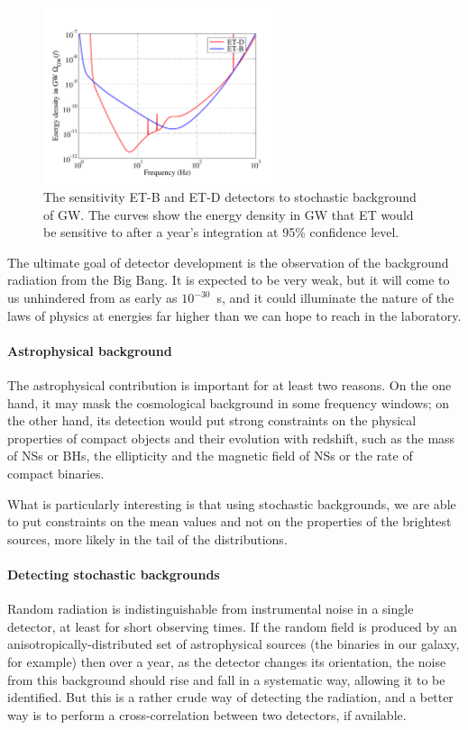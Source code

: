 \begin{figure}
\centering
\includegraphics[width=0.60\textwidth]{./Sec_ET_ScienceCase/GWB.pdf}
\caption{The sensitivity ET-B and ET-D detectors to
stochastic background of GW. The curves show the energy density in GW that 
ET would be sensitive to after a year's integration at 95\% 
confidence level.}
\label{fig:stochastic}
\end{figure}

The ultimate goal of detector development is the observation
of the background radiation from the Big Bang. It is expected to be very weak, 
but it will come to us unhindered from as early as $10^{-30}$~s, and it could 
illuminate the nature of the laws of physics at energies far higher than we 
can hope to reach in the laboratory. 

\paragraph{Astrophysical background}
The astrophysical contribution is important for at least two reasons.
On the one hand, it may mask the cosmological background in some 
frequency windows;  on the other hand, its detection would put 
strong constraints on the physical properties of compact objects 
and their evolution with redshift, such as the mass of NSs or BHs, the 
ellipticity and the magnetic field of NSs or the rate of 
compact binaries.

What is particularly interesting is that using stochastic backgrounds, 
we are able to put constraints on the mean values and not on the 
properties of the brightest sources, more likely in the tail of the 
distributions. 



\paragraph{Detecting stochastic backgrounds}
Random radiation is indistinguishable from instrumental noise in a single 
detector, at least for short observing times. If the random field is produced by
an anisotropically-distributed set of astrophysical sources (the binaries in our 
galaxy, for example) then over a year, as the detector changes its orientation, the 
noise from this background should rise and fall in a systematic way, allowing 
it to be identified. But this is a rather crude way of detecting the radiation, and 
a better way is to perform a cross-correlation between two detectors, if available. 

